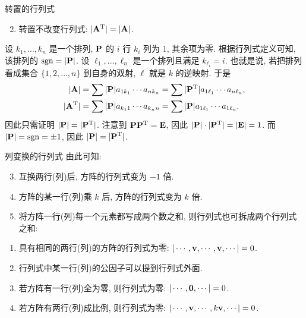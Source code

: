 \begin{frame}{转置的行列式}
	\onslide<+->
	\begin{alertblock@}
		\begin{enumerate}
			\setcounter{enumi}{1}
			\item 转置不改变行列式: $|{\mathbf{A}}^{\mathrm{T}}|=|{\mathbf{A}}|$.
		\end{enumerate}
	\end{alertblock@}
	\onslide<+->
	设 $k_1,\dots,k_n$ 是一个排列, ${\mathbf{P}}$ 的 $i$ 行 $k_i$ 列为 $1$, 其余项为零.
	\onslide<+->
	根据行列式定义可知, 该排列的 $\operatorname{sgn}=|{\mathbf{P}}|$.
	\onslide<+->
	设 $\ell_1,\dots,\ell_n$ 是一个排列且满足 $k_{\ell_i}=i$.
	\onslide<+->
	也就是说, 若把排列看成集合 $\{1,2,\dots,n\}$ 到自身的双射, $\ell$ 就是 $k$ 的逆映射.
	\onslide<+->
	于是
	\begin{align*}
		|{\mathbf{A}}|&=\sum|{\mathbf{P}}| a_{1k_1}\cdots a_{nk_n}=\sum|{\mathbf{P}}^{\mathrm{T}}| a_{1\ell_1}\cdots a_{n\ell_n},\\
		|{\mathbf{A}}^{\mathrm{T}}|&=\sum|{\mathbf{P}}| a_{k_1 1}\cdots a_{k_n n}=\sum|{\mathbf{P}}| a_{1\ell_1}\cdots a_{1 \ell_n}.
	\end{align*}
	\onslide<+->
	因此只需证明 $|{\mathbf{P}}|=|{\mathbf{P}}^{\mathrm{T}}|$.
	\onslide<+->
	注意到 ${\mathbf{P}}{\mathbf{P}}^{\mathrm{T}}={\mathbf{E}}$, 因此 $|{\mathbf{P}}|\cdot|{\mathbf{P}}^{\mathrm{T}}|=|{\mathbf{E}}|=1$.
	\onslide<+->
	而 $|{\mathbf{P}}|=\operatorname{sgn}=\pm1$, 因此 $|{\mathbf{P}}|=|{\mathbf{P}}^{\mathrm{T}}|$.
\end{frame}


\begin{frame}{列变换的行列式}
	\onslide<+->
	由此可知:
	\onslide<+->
	\begin{alertblock@}
		\begin{enumerate}
			\setcounter{enumi}{2}
			\item 互换两行(列)后, 方阵的行列式变为 $-1$ 倍.
			\item 方阵的某一行(列)乘 $k$ 后, 方阵的行列式变为 $k$ 倍.
			\item 将方阵一行(列)每一个元素都写成两个数之和, 则行列式也可拆成两个行列式之和:
		\end{enumerate}
	\end{alertblock@}
	\onslide<+->
	\begin{corollary}
		\begin{enumerate}
			\item 具有相同的两行(列)的方阵的行列式为零: $|\cdots,{\mathbf{v}},\cdots,{\mathbf{v}},\cdots|=0$.
			\item 行列式中某一行(列)的公因子可以提到行列式外面.
			\item 若方阵有一行(列)全为零, 则行列式为零: $|\cdots,{\bf0},\cdots|=0$.
			\item 若方阵有两行(列)成比例, 则行列式为零: $|\cdots,{\mathbf{v}},\cdots,k{\mathbf{v}},\cdots|=0$.
		\end{enumerate}
	\end{corollary}
\end{frame}


